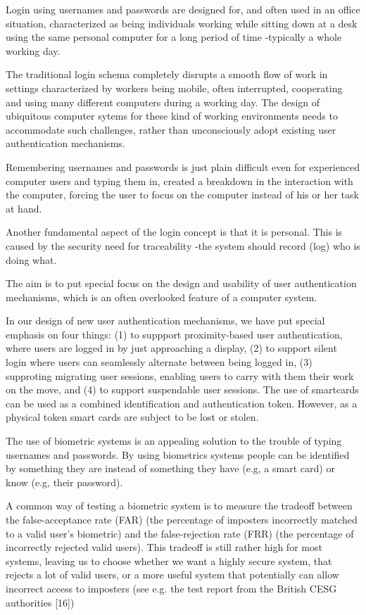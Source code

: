 \documentclass{article}
\begin{document}
Login using usernames and passwords are designed for, and often used in an office situation, characterized as being individuals working while sitting down at a desk using the same personal computer for a long period of time -typically a whole working day. 

The traditional login schema completely disrupts a smooth flow of work in settings characterized by workers being mobile, often interrupted, cooperating and using many different computers during a working day. The design of ubiquitous computer sytems for these kind of working environments needs to accommodate such challenges, rather than unconsciously adopt existing user authentication mechanisms.

Remembering usernames and passwords is just plain difficult even for experienced computer users and typing them in, created a breakdown in the interaction with the computer, forcing the user to focus on the computer instead of his or her task at hand. 

Another fundamental aspect of the login concept is that it is personal. This is caused by the security need for traceability -the system should record (log) who is doing what. 

The aim is to put special focus on the design and usability of user authentication mechanisms, which is an often overlooked feature of a computer system. 

In our design of new user authentication mechanisms, we have put special emphasis on four things: (1) to suppport proximity-based user authentication, where users are logged in by just approaching a display, (2) to support silent login where users can seamlessly alternate between being logged in, (3) supproting migrating user sessions, enabling users to carry with them their work on the move, and (4) to support suspendable user sessions. 
The use of smartcards can be used as a combined identification and authentication token. However, as a physical token smart cards are subject to be lost or stolen. 

The use of biometric systems is an appealing solution to the trouble of typing usernames and passwords. By using biometrics systems people can be identified by something they are instead of something they have (e.g, a smart card) or know (e.g, their password). 

A common way of testing a biometric system is to measure the tradeoff between the false-acceptance rate (FAR) (the percentage of imposters incorrectly matched to a valid user’s biometric) and the false-rejection rate (FRR) (the percentage of incorrectly rejected valid users). This tradeoff is still rather high for most systems, leaving us to choose whether we want a highly secure system, that rejects a lot of valid users, or a more useful system that potentially can allow incorrect access to imposters (see e.g. the test report from the British CESG authorities [16])
\end{document}
